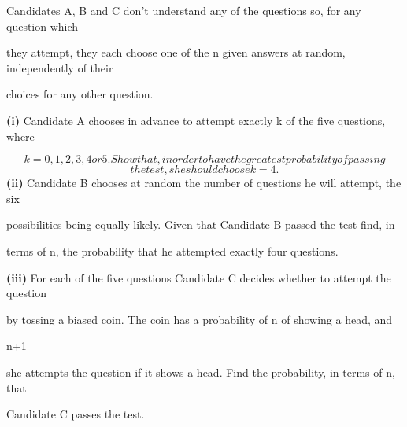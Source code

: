 \documentclass[12pt]{article}
\begin{document}
\begin{flushleft}
Candidates A, B and C don't understand any of the questions so, for any question which\par
they attempt, they each choose one of the n given answers at random, independently of their\par
choices for any other question.\par
\textbf{(i)} Candidate A chooses in advance to attempt exactly k of the five questions, where\par
\[k = 0, 1, 2, 3, 4 or 5. Show that, in order to have the greatest probability of passing\]
\[the test, she should choose k = 4 .\]
\textbf{(ii)} Candidate B chooses at random the number of questions he will attempt, the six\par
possibilities being equally likely. Given that Candidate B passed the test find, in\par
terms of n, the probability that he attempted exactly four questions.\par
\textbf{(iii)} For each of the five questions Candidate C decides whether to attempt the question\par
by tossing a biased coin. The coin has a probability of n of showing a head, and\par
n+1\par
she attempts the question if it shows a head. Find the probability, in terms of n, that\par
Candidate C passes the test.\par
\end{flushleft}
\end{document}
